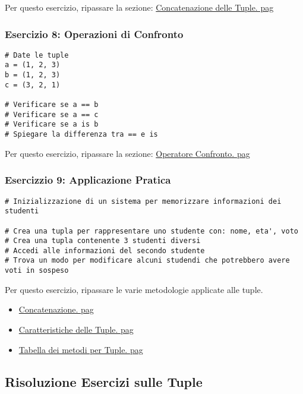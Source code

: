 Per questo esercizio, ripassare la sezione:
 \hyperref[ConcatenazioneTuple]{Concatenazione delle Tuple. pag\pageref{ConcatenazioneTuple}}


 \subsubsection{Esercizio 8: Operazioni di Confronto}\label{Esercizio8ConfrontoTuple}
\begin{lstlisting}
# Date le tuple
a = (1, 2, 3)
b = (1, 2, 3)
c = (3, 2, 1)

# Verificare se a == b
# Verificare se a == c
# Verificare se a is b
# Spiegare la differenza tra == e is
\end{lstlisting}

Per questo esercizio, ripassare la sezione:
\hyperref[ConfrontoOperatoriListe]{Operatore Confronto. pag\pageref{ConfrontoOperatoriListe}}


\subsubsection{Esercizzio 9: Applicazione Pratica}\label{Esercizio9Tuple}
\begin{lstlisting}
# Inizializzazione di un sistema per memorizzare informazioni dei studenti

# Crea una tupla per rappresentare uno studente con: nome, eta', voto
# Crea una tupla contenente 3 studenti diversi
# Accedi alle informazioni del secondo studente
# Trova un modo per modificare alcuni studendi che potrebbero avere voti in sospeso
\end{lstlisting}


Per questo esercizio, ripassare le varie metodologie applicate alle tuple.
\begin{itemize}
    \item \hyperref[ConcatenazioneTuple]{Concatenazione. pag\pageref{ConcatenazioneTuple}}
    \item \hyperref[CaratteristicheTuple]{Caratteristiche delle Tuple. pag\pageref{CaratteristicheTuple}}
    \item \hyperref[TabellaRiassuntiMetodiTuple]{Tabella dei metodi per Tuple. pag\pageref{TabellaRiassuntiMetodiTuple}}
\end{itemize}



\subsection{Risoluzione Esercizi sulle Tuple}\label{RisoluzioneEserciziTuple}

